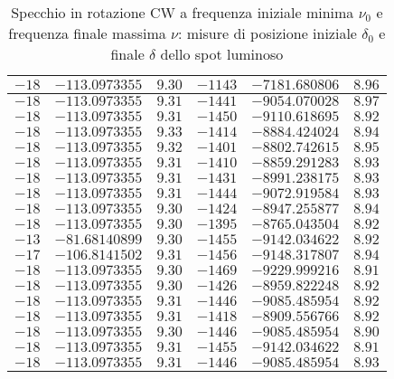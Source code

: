 \documentclass{article} %
\begin{document}
\begin{table}
\begin{tabular}{||c|c|c||c|c|c||}
            $-18 $ & $-113.0973355 $ & $ 9.30 $ & $ -1143 $ & $ -7181.680806 $ & $  8.96 $ \\\hline
            $-18 $ & $-113.0973355 $ & $ 9.31 $ & $ -1441 $ & $ -9054.070028 $ & $  8.97 $ \\\hline
            $-18 $ & $-113.0973355 $ & $ 9.31 $ & $ -1450 $ & $ -9110.618695 $ & $  8.92 $ \\\hline
            $-18 $ & $-113.0973355 $ & $ 9.33 $ & $ -1414 $ & $ -8884.424024 $ & $  8.94 $ \\\hline
            $-18 $ & $-113.0973355 $ & $ 9.32 $ & $ -1401 $ & $ -8802.742615 $ & $  8.95 $ \\\hline
            $-18 $ & $-113.0973355 $ & $ 9.31 $ & $ -1410 $ & $ -8859.291283 $ & $  8.93 $ \\\hline
            $-18 $ & $-113.0973355 $ & $ 9.31 $ & $ -1431 $ & $ -8991.238175 $ & $  8.93 $ \\\hline
            $-18 $ & $-113.0973355 $ & $ 9.31 $ & $ -1444 $ & $ -9072.919584 $ & $  8.93 $ \\\hline
            $-18 $ & $-113.0973355 $ & $ 9.30 $ & $ -1424 $ & $ -8947.255877 $ & $  8.94 $ \\\hline
            $-18 $ & $-113.0973355 $ & $ 9.30 $ & $ -1395 $ & $ -8765.043504 $ & $  8.92 $ \\\hline
            $-13 $ & $-81.68140899 $ & $ 9.30 $ & $ -1455 $ & $ -9142.034622 $ & $  8.92 $ \\\hline
            $-17 $ & $-106.8141502 $ & $ 9.31 $ & $ -1456 $ & $ -9148.317807 $ & $  8.94 $ \\\hline
            $-18 $ & $-113.0973355 $ & $ 9.30 $ & $ -1469 $ & $ -9229.999216 $ & $  8.91 $ \\\hline
            $-18 $ & $-113.0973355 $ & $ 9.30 $ & $ -1426 $ & $ -8959.822248 $ & $  8.92 $ \\\hline
            $-18 $ & $-113.0973355 $ & $ 9.31 $ & $ -1446 $ & $ -9085.485954 $ & $  8.92 $ \\\hline
            $-18 $ & $-113.0973355 $ & $ 9.31 $ & $ -1418 $ & $ -8909.556766 $ & $  8.92 $ \\\hline
            $-18 $ & $-113.0973355 $ & $ 9.30 $ & $ -1446 $ & $ -9085.485954 $ & $  8.90 $ \\\hline
            $-18 $ & $-113.0973355 $ & $ 9.31 $ & $ -1455 $ & $ -9142.034622 $ & $  8.91 $ \\\hline
            $-18 $ & $-113.0973355 $ & $ 9.31 $ & $ -1446 $ & $ -9085.485954 $ & $  8.93 $ \\\hline
        \end{tabular}
        \caption{Specchio in rotazione CW a frequenza iniziale minima $\nu_0$ e frequenza finale massima $\nu$: misure di posizione iniziale $\delta_0$ e finale $\delta$ dello spot luminoso}
        \label{CW_min_max}
    \end{table}
\end{document}
